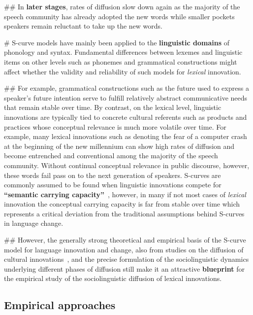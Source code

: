 \documentclass[a4paper]{scrartcl}
\renewcommand{\hw}[1]{\textbf{#1}}
\begin{document}
\begin{easylist}[itemize]
        ## In \hw{later stages}, rates of diffusion slow down again as the majority of the speech community has already adopted the new words while smaller pockets speakers remain reluctant to take up the new words.

      # S-curve models have mainly been applied to the \hw{linguistic domains} of phonology and syntax. Fundamental differences between lexemes and linguistic items on other levels such as phonemes and grammatical constructions might affect whether the validity and reliability of such models for \emph{lexical} innovation.

        ## For example, grammatical constructions such as the  future used to express a speaker's future intention serve to fulfill relatively abstract communicative needs that remain stable over time. By contrast, on the lexical level, linguistic innovations are typically tied to concrete cultural referents such as products and practices whose conceptual relevance is much more volatile over time. For example, many lexical innovations such as  denoting the fear of a computer crash at the beginning of the new millennium can show high rates of diffusion and become entrenched and conventional among the majority of the speech community. Without continual conceptual relevance in public discourse, however, these words fail pass on to the next generation of speakers. S-curves are commonly assumed to be found when linguistic innovations compete for \hw{\enquote{semantic carrying capacity}}~\parencite{Nini2017}, however, in many if not most cases of \emph{lexical} innovation the conceptual carrying capacity is far from stable over time which represents a critical deviation from the traditional assumptions behind S-curves in language change.

        ## However, the generally strong theoretical and empirical basis of the S-curve model for language innovation and change, also from studies on the diffusion of cultural innovations~\parencite{Rogers1962}, and the precise formulation of the sociolinguistic dynamics underlying different phases of diffusion still make it an attractive \hw{blueprint} for the empirical study of the sociolinguistic diffusion of lexical innovations.

    \end{easylist}

  \subsection{Empirical approaches}
\end{document}
